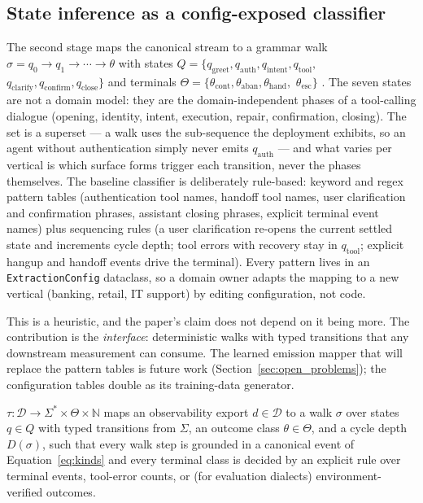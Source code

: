 \subsection{State inference as a config-exposed classifier}
The second stage maps the canonical stream to a grammar walk
$\sigma = q_0 \to q_1 \to \cdots \to \theta$ with states
$Q = \{q_{\mathrm{greet}}, q_{\mathrm{auth}}, q_{\mathrm{intent}}, q_{\mathrm{tool}},$
$q_{\mathrm{clarify}}, q_{\mathrm{confirm}}, q_{\mathrm{close}}\}$ and terminals
$\Theta = \{\theta_{\mathrm{cont}}, \theta_{\mathrm{aban}}, \theta_{\mathrm{hand}},$
$\theta_{\mathrm{esc}}\}$ \citep{garcia2026grammar}.
The seven states are not a domain model: they are the domain-independent phases of a
tool-calling dialogue (opening, identity, intent, execution, repair, confirmation, closing).
The set is a superset --- a walk uses the sub-sequence the deployment exhibits, so an agent
without authentication simply never emits $q_{\mathrm{auth}}$ --- and what varies per vertical
is which surface forms trigger each transition, never the phases themselves.
The baseline classifier is deliberately rule-based: keyword and regex pattern tables
(authentication tool names, handoff tool names, user clarification and confirmation phrases,
assistant closing phrases, explicit terminal event names) plus sequencing rules (a user
clarification re-opens the current settled state and increments cycle depth; tool errors with
recovery stay in $q_{\mathrm{tool}}$; explicit hangup and handoff events drive the terminal).
Every pattern lives in an \texttt{ExtractionConfig} dataclass, so a domain owner adapts the
mapping to a new vertical (banking, retail, IT support) by editing configuration, not code.

This is a heuristic, and the paper's claim does not depend on it being more.
The contribution is the \emph{interface}: deterministic walks with typed transitions that any
downstream measurement can consume.
The learned emission mapper that will replace the pattern tables is future work
(Section~\ref{sec:open_problems}); the configuration tables double as its training-data
generator.

\begin{definition}
\label{def:tau}
$\tau : \mathcal{D} \to \Sigma^* \times \Theta \times \mathbb{N}$ maps an observability export
$d \in \mathcal{D}$ to a walk $\sigma$ over states $q \in Q$ with typed transitions from
$\Sigma$, an outcome class $\theta \in \Theta$, and a cycle depth $D(\sigma)$, such that every
walk step is grounded in a canonical event of Equation~\eqref{eq:kinds} and every terminal
class is decided by an explicit rule over terminal events, tool-error counts, or (for
evaluation dialects) environment-verified outcomes.
\end{definition}

